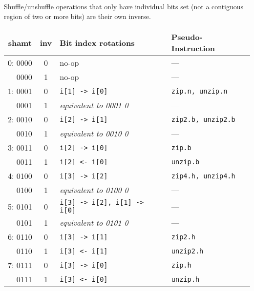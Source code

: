 Shuffle/unshuffle operations that only have individual bits set (not a contiguous
region of two or more bits) are their own inverse.

\begin{table}[h]
\begin{small}
\begin{center}
\begin{tabular}{r c l l}
\multicolumn{1}{c}{shamt} &
\multicolumn{1}{c}{inv} &
Bit index rotations &
Pseudo-Instruction \\

\hline

 0: 0000 & 0 & no-op                            & ---                    \\
    0000 & 1 & no-op                            & ---                    \\
 1: 0001 & 0 & {\tt i[1] -> i[0]}               & {\tt zip.n, unzip.n}   \\
    0001 & 1 & {\it equivalent to 0001 0}       & ---                    \\
 2: 0010 & 0 & {\tt i[2] -> i[1]}               & {\tt zip2.b, unzip2.b} \\
    0010 & 1 & {\it equivalent to 0010 0}       & ---                    \\
 3: 0011 & 0 & {\tt i[2] -> i[0]}               & {\tt zip.b}            \\
    0011 & 1 & {\tt i[2] <- i[0]}               & {\tt unzip.b}          \\

\hline

 4: 0100 & 0 & {\tt i[3] -> i[2]}               & {\tt zip4.h, unzip4.h} \\
    0100 & 1 & {\it equivalent to 0100 0}       & ---                    \\
 5: 0101 & 0 & {\tt i[3] -> i[2], i[1] -> i[0]} & ---                    \\
    0101 & 1 & {\it equivalent to 0101 0}       & ---                    \\
 6: 0110 & 0 & {\tt i[3] -> i[1]}               & {\tt zip2.h}           \\
    0110 & 1 & {\tt i[3] <- i[1]}               & {\tt unzip2.h}         \\
 7: 0111 & 0 & {\tt i[3] -> i[0]}               & {\tt zip.h}            \\
    0111 & 1 & {\tt i[3] <- i[0]}               & {\tt unzip.h}          \\


\end{tabular}
\end{center}
\end{small}
\end{table}
